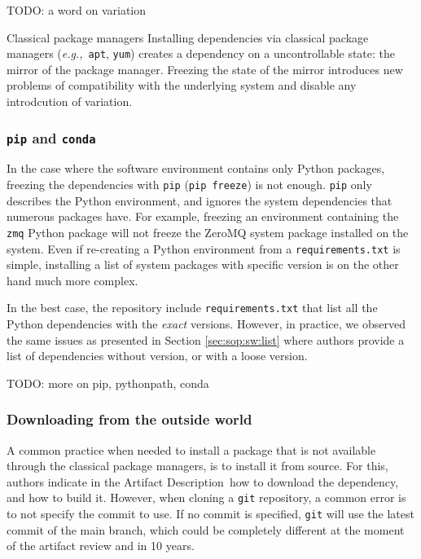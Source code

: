 \documentclass[sigconf]{acmart}
\newcommand{\eg}{\emph{e.g.,}}
\newcommand{\ad}{Artifact Description}
\newcommand{\todo}[1]{{\color{red}TODO: #1}}
\begin{document}
\todo{a word on variation}


\begin{lesson}{Classical package managers}{}
  Installing dependencies via classical package managers (\eg\ \texttt{apt}, \texttt{yum}) creates a dependency on a uncontrollable state: the mirror of the package manager.
  Freezing the state of the mirror introduces new problems of compatibility with the underlying system and disable any introdcution of variation.
\end{lesson}

\subsubsection{\texttt{pip} and \texttt{conda}}

In the case where the software environment contains only Python packages, freezing the dependencies with \texttt{pip} (\texttt{pip freeze}) is not enough.
\texttt{pip} only describes the Python environment, and ignores the system dependencies that numerous packages have. 
For example, freezing an environment containing the \texttt{zmq} Python package will not freeze the ZeroMQ system package installed on the system.  
Even if re-creating a Python environment from a \texttt{requirements.txt} is simple, installing a list of system packages with specific version is on the other hand much more complex.

In the best case, the repository include \texttt{requirements.txt} that list all the Python dependencies with the \emph{exact} versions.
However, in practice, we observed the same issues as presented in Section \ref{sec:sop:sw:list} where authors provide a list of dependencies without version, or with a loose version.

\todo{more on pip, pythonpath, conda}

\subsubsection{Downloading from the outside world}

A common practice when needed to install a package that is not available through the classical package managers, is to install it from source.
For this, authors indicate in the \ad\ how to download the dependency, and how to build it.
However, when cloning a \texttt{git} repository, a common error is to not specify the commit to use.
If no commit is specified, \texttt{git} will use the latest commit of the main branch, which could be completely different at the moment of the artifact review and in 10 years.
\end{document}
